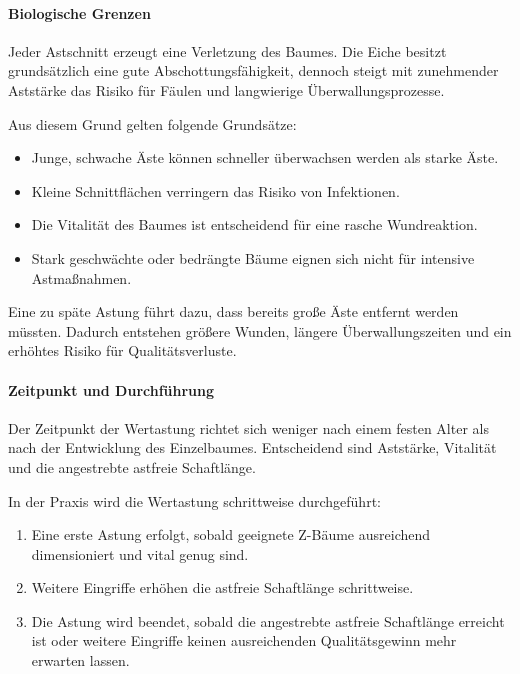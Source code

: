 \documentclass[twocolumn, bibliography=totoc, abstract=true]{scrartcl}
\begin{document}
\paragraph{Biologische Grenzen}

Jeder Astschnitt erzeugt eine Verletzung des Baumes. Die Eiche besitzt grundsätzlich eine gute Abschottungsfähigkeit, dennoch steigt mit zunehmender Aststärke das Risiko für Fäulen und langwierige Überwallungsprozesse.

Aus diesem Grund gelten folgende Grundsätze:

\begin{itemize}
\item Junge, schwache Äste können schneller überwachsen werden als starke Äste.
\item Kleine Schnittflächen verringern das Risiko von Infektionen.
\item Die Vitalität des Baumes ist entscheidend für eine rasche Wundreaktion.
\item Stark geschwächte oder bedrängte Bäume eignen sich nicht für intensive Astmaßnahmen.
\end{itemize}

Eine zu späte Astung führt dazu, dass bereits große Äste entfernt werden müssten. Dadurch entstehen größere Wunden, längere Überwallungszeiten und ein erhöhtes Risiko für Qualitätsverluste.

\paragraph{Zeitpunkt und Durchführung}

Der Zeitpunkt der Wertastung richtet sich weniger nach einem festen Alter als nach der Entwicklung des Einzelbaumes. Entscheidend sind Aststärke, Vitalität und die angestrebte astfreie Schaftlänge.

In der Praxis wird die Wertastung schrittweise durchgeführt:

\begin{enumerate}
\item Eine erste Astung erfolgt, sobald geeignete Z-Bäume ausreichend dimensioniert und vital genug sind.
\item Weitere Eingriffe erhöhen die astfreie Schaftlänge schrittweise.
\item Die Astung wird beendet, sobald die angestrebte astfreie Schaftlänge erreicht ist oder weitere Eingriffe keinen ausreichenden Qualitätsgewinn mehr erwarten lassen.
\end{enumerate}
\end{document}
